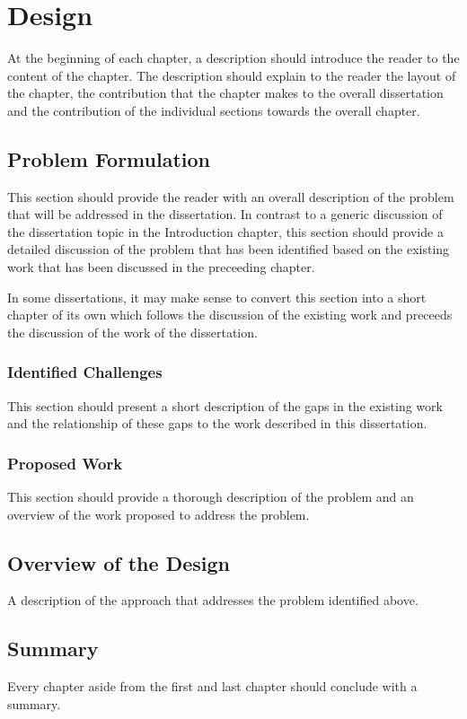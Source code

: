 \chapter{Design}
\label{chap:Design}

At the beginning of each chapter, a description should introduce the reader to the content of the chapter. The description should explain to the reader the layout of the chapter, the contribution that the chapter makes to the overall dissertation and the contribution of the individual sections towards the overall chapter.


\section{Problem Formulation}
\label{sec:ProblemFormulation}

This section should provide the reader with an overall description of the problem that will be addressed in the dissertation. In contrast to a generic discussion of the dissertation topic in the Introduction chapter, this section should provide a detailed discussion of the problem that has been identified based on the existing work that has been discussed in the preceeding chapter. 

In some dissertations, it may make sense to convert this section into a short chapter of its own which follows the discussion of the existing work and preceeds the discussion of the work of the dissertation.

\subsection{Identified Challenges}
This section should present a short description of the gaps in the existing work and the relationship of these gaps to the work described in this dissertation.

\subsection{Proposed Work}
This section should provide a thorough description of the problem and an overview of the work proposed to address the problem.


\section{Overview of the Design}
\label{sec:OverviewOfDesign}
A description of the approach that addresses the problem identified above.


\section{Summary}
\label{sec:SummaryDesign}

Every chapter aside from the first and last chapter should conclude with a summary. 